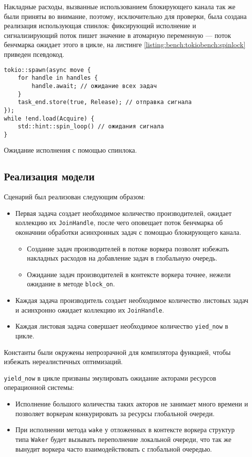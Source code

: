 Накладные расходы, вызванные использованием блокирующего канала так же были приняты во внимание, поэтому, исключительно для проверки, была создана реализация использующая спинлок: фиксирующий исполнение и сигнализирующий поток пишет значение в атомарную переменную --- поток бенчмарка ожидает этого в цикле, на листинге \ref{listing:bench:tokiobench:spinlock} приведен псевдокод.

\begin{listing}[H]
    \begin{verbatim}
tokio::spawn(async move {
    for handle in handles {
        handle.await; // ожидание всех задач
    }
    task_end.store(true, Release); // отправка сигнала
});
while !end.load(Acquire) {
    std::hint::spin_loop() // ожидания сигнала
}
    \end{verbatim}
    \caption{Ожидание исполнения с помощью спинлока.}
    \label{listing:bench:tokiobench:spinlock}
\end{listing}

\subsection{Реализация модели}

Сценарий был реализован следующим образом:

\begin{itemize}
    \item Первая задача создает необходимое количество производителей, ожидает коллекцию их \verb|JoinHandle|, после чего оповещает поток бенчмарка об оконачнии обработки асинхронных задач с помощью блокирующего канала.
    \begin{itemize}
        \item Создание задач производителей в потоке воркера позволят избежать накладных расходов на добавление задач в глобальную очередь.
        \item Ожидание задач производителей в контексте воркера точнее, нежели ожидание в методе \verb|block_on|.
    \end{itemize}
    \item Каждая задача производитель создает необходимое количество листовых задач и асинхронно ожидает коллекцию их \verb|JoinHandle|.
    \item Каждая листовая задача совершает необходимое количество \verb|yied_now| в цикле.
\end{itemize}

Константы  были окружены непрозрачной для компилятора функцией, чтобы избежать нереалистичных оптимизаций.

\verb|yield_now| в цикле призваны эмулировать ожидание акторами ресурсов операционной системы:

\begin{itemize}
    \item Исполнение большого количества таких акторов не занимает много времени и позволяет воркерам конкурировать за ресурсы глобальной очереди.
    \item При исполнении метода \verb|wake| у отложенных в контексте воркера структур типа \verb|Waker| будет вызывать переполнение локальной очереди, что так же вынудит воркера часто взаимодействовать с глобальной очередью.
\end{itemize}
